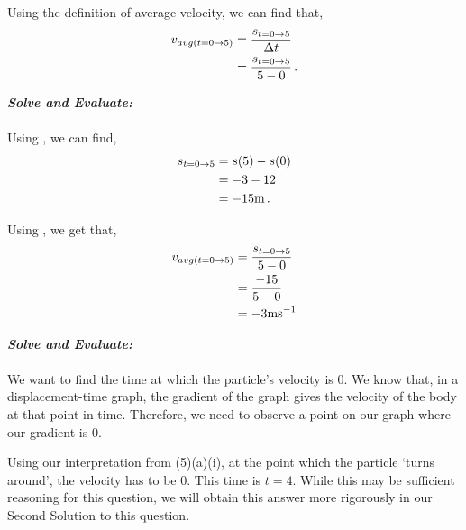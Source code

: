 \begin{subquestions}
\begin{subsubquestions}
\begin{subsubsubquestions}
Using the definition of average velocity, we can find that,
\begin{align}
	v_{avg(t=0 \rightarrow 5)} & = \frac{s_{t=0 \rightarrow 5}}{\Delta t} \nonumber \\
	                           & = \frac{s_{t=0 \rightarrow 5}}{5-0} \,. \label{2014:q5:Seqn5}
\end{align}

\textbf{\textit{Solve and Evaluate:}} \\ \\
Using , we can find,
\begin{align}
	s_{t=0 \rightarrow 5} & =  s(5)-s(0) \nonumber \\
	                      & = -3 - 12 \nonumber \\
	                      & = -15 \text{m} \,.
\end{align}

Using , we get that,
\begin{align}
	v_{avg(t=0 \rightarrow 5)} & =\frac{s_{t=0 \rightarrow 5}}{5-0} \nonumber \\
								 & = \frac{-15}{5-0} \nonumber \\
								 & = -3 \text{ms}^{-1} 
\end{align}


\subsubsubquestion

\textbf{\textit{Solve and Evaluate:}} \\ \\
We want to find the time at which the particle's velocity is 0. We know that, in a displacement-time graph, the gradient of the graph gives the velocity of the body at that point in time. Therefore, we need to observe a point on our graph where our gradient is 0. 

Using our interpretation from (5)(a)(i), at the point which the particle `turns around', the velocity has to be 0. This time is $t=4$. While this may be sufficient reasoning for this question, we will obtain this answer more rigorously in our Second Solution to this question. 

\end{subsubsubquestions}

\end{subsubquestions}
	


\end{subquestions}
